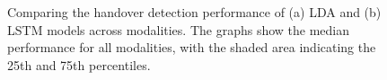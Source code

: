 
\begin{figure}[b!]
    \centering
    \caption{\justifying Comparing the handover detection performance of (a) LDA and (b) LSTM models across modalities. The graphs show the median performance for all modalities, with the shaded area indicating the 25th and 75th percentiles.}
    \label{fig:lda-lstm}
\end{figure}
